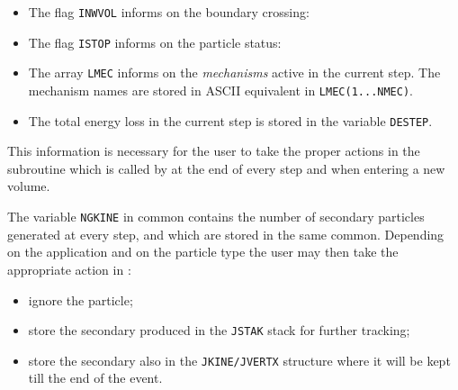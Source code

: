 \begin{itemize}
\item The flag {\tt INWVOL} informs on the boundary crossing:
\item  The flag {\tt ISTOP} informs on the particle status:
\item The array {\tt LMEC} informs on the {\it mechanisms} active in the
current step. The mechanism names are stored in ASCII equivalent in 
{\tt LMEC(1...NMEC)}.
\item The total energy loss in the current step is
stored in the variable {\tt DESTEP}.
\end{itemize}

This information is necessary for the user to take
the proper actions in the subroutine
 which is called by  at the end of every step
and when entering a new volume.

The variable {\tt NGKINE} in common  contains the number of
secondary particles generated at every step, and which are stored in the
same common.
Depending on the application and on the particle type the user may then
take the appropriate action in :
\begin{itemize}
\item ignore the particle;
\item store the secondary produced in the {\tt JSTAK} stack for further
tracking;
\item store the secondary also in the {\tt JKINE/JVERTX} structure where
it will be kept till the end of the event.
\end{itemize}

